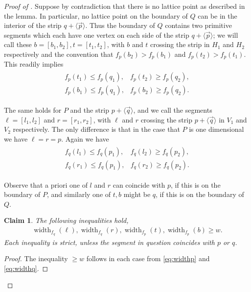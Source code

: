 \documentclass{amsart}
\theoremstyle{plain}
\newtheorem{claim}[theorem]{Claim}
\theoremstyle{definition}
\newcommand{\width}{\operatorname{width}}
\renewcommand{\vec}[1]{\overrightarrow#1}
\newcommand{\vecline}[1]{\langle \vec #1 \rangle}
\begin{document}
\begin{proof}[Proof of ]
Suppose by contradiction that there is no lattice point as described in the lemma. In particular, no lattice point on the boundary of $Q$ can be in the interior of the strip $q + \vecline p$.  Thus the boundary of $Q$ contains two primitive segments which each have one vertex on each side of the strip $q + \vecline p$; we will call these  $b=[b_1, b_2], t=[t_1, t_2]$, with $b$ and $t$ crossing the strip in $H_1$ and $H_2$ respectively and the convention that $f_p(b_2) >f_p(b_1)$ and $f_p(t_2) >f_p(t_1)$. This readily implies 
\begin{gather}
\label{eq:widthq}
\begin{array}{cc}
f_p(t_1) \leq f_p(q_1), &
f_p(t_2) \geq f_p(q_2), \\
f_p(b_1) \leq f_p(q_1), &
f_p(b_2) \geq f_p(q_2).
\end{array}
\end{gather}


The same holds for $P$ and the strip $p+\vecline q$, and we call the segments $\ell=[l_1, l_2]$ and $r=[r_1, r_2]$, with $\ell$ and $r$ crossing the strip $p + \vecline q$  in $V_1$ and $ V_2$ respectively. The only difference is that in the case that $P$ is one dimensional we have $\ell=r=p$.  Again we have
\begin{gather}
\label{eq:widthp}
\begin{array}{cc}
f_q(l_1) \leq f_q(p_1), &
f_q(l_2) \geq f_q(p_2), \\
f_q(r_1) \leq f_q(p_1),&
f_q(r_2) \geq f_q(p_2).
\end{array}
\end{gather}

Observe that a priori one of $l$ and $r$ can coincide with $p$, if this is on the boundary of $P$, and similarly one of $t,b$ might be $q$, if this is on the boundary of $Q$. 


\begin{claim}
The following inequalities hold, 
\begin{align*}
\width_{f_q}(\ell) , 
\width_{f_q}(r) ,
\width_{f_p}(t) ,
\width_{f_p}(b) \geq w.
\end{align*}
Each inequality is strict, unless the segment in question coincides with $p$ or $q$.
\end{claim}

\begin{proof}
The inequality $\geq w$ follows in each case from \eqref{eq:widthp} and \eqref{eq:widthq}.


\end{proof}
\end{proof}
\end{document}
